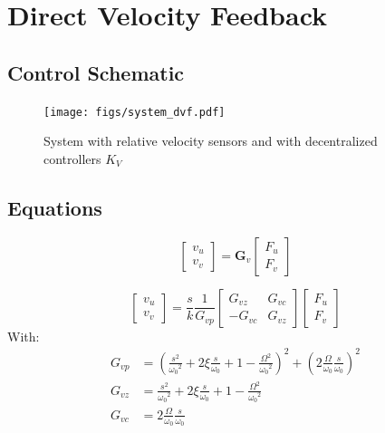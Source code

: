 \documentclass{ISMA_USD2020}
\begin{document}
\section{Direct Velocity Feedback}
\label{sec:org5cb3076}
\subsection{Control Schematic}
\label{sec:orgaaa522f}

\begin{figure}[htbp]
\centering
\texttt{[image: figs/system\_dvf.pdf]}
\caption{\label{fig:system_dvf}System with relative velocity sensors and with decentralized controllers \(K_V\)}
\end{figure}

\subsection{Equations}
\label{sec:orge0a4555}

\begin{equation}
\begin{bmatrix} v_u \\ v_v \end{bmatrix} =
\bm{G}_v
\begin{bmatrix} F_u \\ F_v \end{bmatrix}
\end{equation}

\begin{equation}
\begin{bmatrix} v_u \\ v_v \end{bmatrix} =
\frac{s}{k} \frac{1}{G_{vp}}
\begin{bmatrix}
   G_{vz} & G_{vc} \\
  -G_{vc} & G_{vz}
\end{bmatrix}
\begin{bmatrix} F_u \\ F_v \end{bmatrix}
\end{equation}
With:
\begin{align}
  G_{vp} &= \left( \frac{s^2}{{\omega_0}^2} + 2 \xi \frac{s}{\omega_0} + 1 - \frac{{\Omega}^2}{{\omega_0}^2} \right)^2 + \left( 2 \frac{\Omega}{\omega_0} \frac{s}{\omega_0} \right)^2 \\
  G_{vz} &= \frac{s^2}{{\omega_0}^2} + 2 \xi \frac{s}{\omega_0} + 1 - \frac{{\Omega}^2}{{\omega_0}^2} \\
  G_{vc} &= 2 \frac{\Omega}{\omega_0} \frac{s}{\omega_0}
\end{align}
\end{document}
